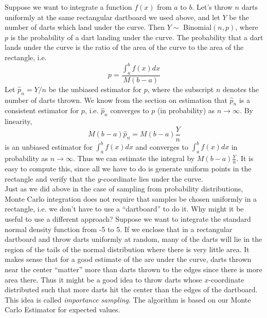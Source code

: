 \documentclass[12pt]{article}
\theoremstyle{definition}
\theoremstyle{remark}
\begin{document}
Suppose we want to integrate a function $f(x)$ from $a$ to $b$. Let's throw $n$ darts uniformly at the same rectangular dartboard we used above, and let $Y$ be the number of darts which land under the curve. Then $Y \sim$ Binomial$(n, p)$, where $p$ is the probability of a dart landing under the curve. The probability that a dart lands under the curve is the ratio of the area of the curve to the area of the rectangle, i.e.
\[
p = \dfrac{\int_a^b f(x) dx}{M(b-a)}
\]
Let $\hat{p}_n = Y/n$ be the unbiased estimator for $p$, where the subscript $n$ denotes the number of darts thrown. We know from the section on estimation that $\hat{p}_n$ is a consistent estimator for $p$, i.e. $\hat{p}_n$ converges to $p$ (in probability) as $n \rightarrow \infty$. By linearity,
\[
M(b-a) \hat{p}_n = M(b-a)\frac{Y}{n}
\] 
is an unbiased estimator for $\int_a^b f(x) dx$ and converges to $\int_a^b f(x) dx$ in probability as $n \rightarrow \infty$. Thus we can estimate the integral by $M(b-a)\frac{Y}{n}$. It is easy to compute this, since all we have to do is generate uniform points in the rectangle and verify that the $y$-coordinate lies under the curve.\\

Just as we did above in the case of sampling from probability distributions, Monte Carlo integration does not require that samples be chosen uniformly in a rectangle, i.e. we don't have to use a ``dartboard'' to do it. Why might it be useful to use a different approach? Suppose we want to integrate the standard normal density function from -5 to 5. If we enclose that in a rectangular dartboard and throw darts uniformly at random, many of the darts will lie in the region of the tails of the normal distribution where there is very little area. It makes sense that for a good estimate of the are under the curve, darts thrown near the center ``matter'' more than darts thrown to the edges since there is more area there. Thus it might be a good idea to throw darts whose $x$-coordinate distributed such that more darts hit the center than the edges of the dartboard. This idea is called \emph{importance sampling}. The algorithm is based on our Monte Carlo Estimator for expected values.\\
\end{document}
